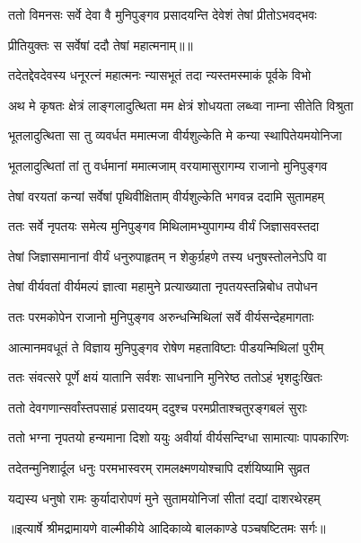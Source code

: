 \twolineshloka
{ततो विमनसः सर्वे देवा वै मुनिपुङ्गव}
{प्रसादयन्ति देवेशं तेषां प्रीतोऽभवद्भवः} %

{प्रीतियुक्तः स सर्वेषां ददौ तेषां महात्मनाम्॥॥} %

\addtocounter{shlokacount}{1}

\twolineshloka
{तदेतद्देवदेवस्य धनूरत्नं महात्मनः}
{न्यासभूतं तदा न्यस्तमस्माकं पूर्वके विभो} %

\twolineshloka
{अथ मे कृषतः क्षेत्रं लाङ्गलादुत्थिता मम}
{क्षेत्रं शोधयता लब्ध्वा नाम्ना सीतेति विश्रुता} %

\twolineshloka
{भूतलादुत्थिता सा तु व्यवर्धत ममात्मजा}
{वीर्यशुल्केति मे कन्या स्थापितेयमयोनिजा} %

\twolineshloka
{भूतलादुत्थितां तां तु वर्धमानां ममात्मजाम्}
{वरयामासुरागम्य राजानो मुनिपुङ्गव} %

\twolineshloka
{तेषां वरयतां कन्यां सर्वेषां पृथिवीक्षिताम्}
{वीर्यशुल्केति भगवन्न ददामि सुतामहम्} %

\twolineshloka
{ततः सर्वे नृपतयः समेत्य मुनिपुङ्गव}
{मिथिलामभ्युपागम्य वीर्यं जिज्ञासवस्तदा} %

\twolineshloka
{तेषां जिज्ञासमानानां वीर्यं धनुरुपाहृतम्}
{न शेकुर्ग्रहणे तस्य धनुषस्तोलनेऽपि वा} %

\twolineshloka
{तेषां वीर्यवतां वीर्यमल्पं ज्ञात्वा महामुने}
{प्रत्याख्याता नृपतयस्तन्निबोध तपोधन} %

\twolineshloka
{ततः परमकोपेन राजानो मुनिपुङ्गव}
{अरुन्धन्मिथिलां सर्वे वीर्यसन्देहमागताः} %

\twolineshloka
{आत्मानमवधूतं ते विज्ञाय मुनिपुङ्गव}
{रोषेण महताविष्टाः पीडयन्मिथिलां पुरीम्} %

\twolineshloka
{ततः संवत्सरे पूर्णे क्षयं यातानि सर्वशः}
{साधनानि मुनिरेष्ठ ततोऽहं भृशदुःखितः} %

\twolineshloka
{ततो देवगणान्सर्वांस्तपसाहं प्रसादयम्}
{ददुश्च परमप्रीताश्चतुरङ्गबलं सुराः} %

\twolineshloka
{ततो भग्ना नृपतयो हन्यमाना दिशो ययुः}
{अवीर्या वीर्यसन्दिग्धा सामात्याः पापकारिणः} %

\twolineshloka
{तदेतन्मुनिशार्दूल धनुः परमभास्वरम्}
{रामलक्ष्मणयोश्चापि दर्शयिष्यामि सुव्रत} %

\twolineshloka
{यद्यस्य धनुषो रामः कुर्यादारोपणं मुने}
{सुतामयोनिजां सीतां दद्यां दाशरथेरहम्} %


{॥इत्यार्षे श्रीमद्रामायणे वाल्मीकीये आदिकाव्ये बालकाण्डे पञ्चषष्टितमः सर्गः॥}

